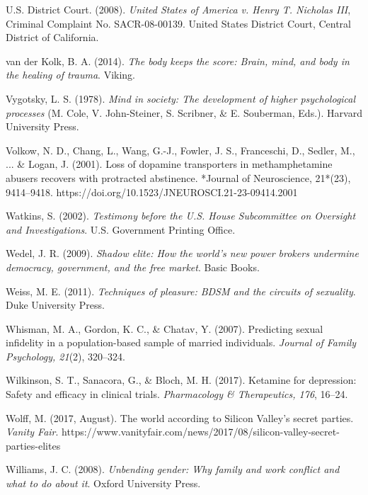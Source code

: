 \begin{thebibliography}{}
    U.S. District Court. (2008). \textit{United States of America v. Henry T. Nicholas III}, Criminal Complaint No. SACR-08-00139. United States District Court, Central District of California.

    van der Kolk, B. A. (2014). \textit{The body keeps the score: Brain, mind, and body in the healing of trauma}. Viking.

    Vygotsky, L. S. (1978). \textit{Mind in society: The development of higher psychological processes} (M. Cole, V. John-Steiner, S. Scribner, \& E. Souberman, Eds.). Harvard University Press.

    Volkow, N. D., Chang, L., Wang, G.-J., Fowler, J. S., Franceschi, D., Sedler, M., ... \& Logan, J. (2001). Loss of dopamine transporters in methamphetamine abusers recovers with protracted abstinence. *Journal of Neuroscience, 21*(23), 9414–9418. https://doi.org/10.1523/JNEUROSCI.21-23-09414.2001
    
    Watkins, S. (2002). \textit{Testimony before the U.S. House Subcommittee on Oversight and Investigations}. U.S. Government Printing Office.

    Wedel, J. R. (2009). \textit{Shadow elite: How the world's new power brokers undermine democracy, government, and the free market}. Basic Books.

    Weiss, M. E. (2011). \textit{Techniques of pleasure: BDSM and the circuits of sexuality}. Duke University Press.

    Whisman, M. A., Gordon, K. C., \& Chatav, Y. (2007). Predicting sexual infidelity in a population-based sample of married individuals. \textit{Journal of Family Psychology, 21}(2), 320–324.

    Wilkinson, S. T., Sanacora, G., \& Bloch, M. H. (2017). Ketamine for depression: Safety and efficacy in clinical trials. \textit{Pharmacology \& Therapeutics, 176}, 16–24.

    Wolff, M. (2017, August). The world according to Silicon Valley’s secret parties. \textit{Vanity Fair}. https://www.vanityfair.com/news/2017/08/silicon-valley-secret-parties-elites
    
    Williams, J. C. (2008). \textit{Unbending gender: Why family and work conflict and what to do about it}. Oxford University Press.


\end{thebibliography}

